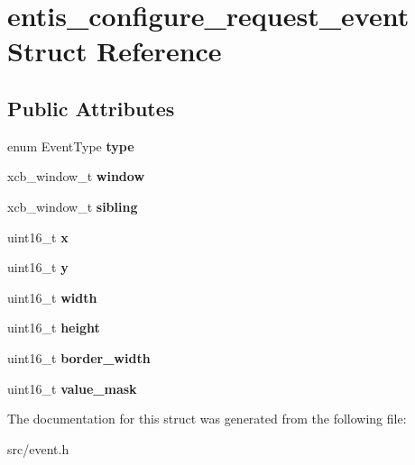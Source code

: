 \hypertarget{structentis__configure__request__event}{}\section{entis\+\_\+configure\+\_\+request\+\_\+event Struct Reference}
\label{structentis__configure__request__event}
\subsection*{Public Attributes}
\begin{DoxyCompactItemize}
\item 
\mbox{\label{structentis__configure__request__event_a99dd5728f7024bcfcfe0401ecb669cab}} 
enum Event\+Type {\bfseries type}
\item 
\mbox{\label{structentis__configure__request__event_abc9637b7b906ba07c8c311256b686da3}} 
xcb\+\_\+window\+\_\+t {\bfseries window}
\item 
\mbox{\label{structentis__configure__request__event_ac86b05866358d6af1782bb17d6ebc76e}} 
xcb\+\_\+window\+\_\+t {\bfseries sibling}
\item 
\mbox{\label{structentis__configure__request__event_a3ebc23fdd88e15cedad2cb679e7d9b0d}} 
uint16\+\_\+t {\bfseries x}
\item 
\mbox{\label{structentis__configure__request__event_a0d32060d16c74fe091d8ba90862a5ba8}} 
uint16\+\_\+t {\bfseries y}
\item 
\mbox{\label{structentis__configure__request__event_a5cd0d955a96d811fd76a392a1f5e0bf6}} 
uint16\+\_\+t {\bfseries width}
\item 
\mbox{\label{structentis__configure__request__event_aa7298d1bcd5164b7555973aad23cf162}} 
uint16\+\_\+t {\bfseries height}
\item 
\mbox{\label{structentis__configure__request__event_a0046bb091233c06a271a80908fb74286}} 
uint16\+\_\+t {\bfseries border\+\_\+width}
\item 
\mbox{\label{structentis__configure__request__event_afc01d16f3606a824a2d6daf71995c49c}} 
uint16\+\_\+t {\bfseries value\+\_\+mask}
\end{DoxyCompactItemize}


The documentation for this struct was generated from the following file\+:\begin{DoxyCompactItemize}
\item 
src/event.\+h\end{DoxyCompactItemize}
